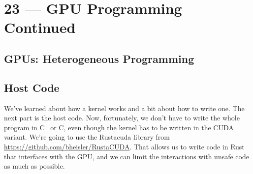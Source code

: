 \documentclass[a4paper]{report}
\newcommand{\CPP}{C\nolinebreak\hspace{-.05em}\raisebox{.4ex}{\tiny\bf +}\nolinebreak\hspace{-.10em}\raisebox{.4ex}{\tiny\bf +}}
\def\CPP{{C\nolinebreak[4]\hspace{-.05em}\raisebox{.4ex}{\tiny\bf ++}}}
\begin{document}
\chapter*{23 --- GPU Programming Continued}


\section*{GPUs: Heterogeneous Programming}

\section*{Host Code}
We've learned about how a kernel works and a bit about how to write one. The next part is the host code. Now, fortunately, we don't have to write the whole program in \CPP~ or C, even though the kernel has to be written in the CUDA variant. We're going to use the Rustacuda library from \url{https://github.com/bheisler/RustaCUDA}. That allows us to write code in Rust that interfaces with the GPU, and we can limit the interactions with unsafe code as much as possible.
 
\end{document}
